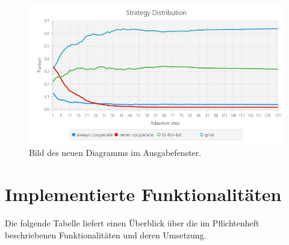 \documentclass[parskip=full,11pt]{scrartcl}
\begin{document}
\begin{figure}[h]
	\centering
	\includegraphics[width=\linewidth]{img/newoutput.png}
	\caption{Bild des neuen Diagramms im Ausgabefenster.}
	\label{fig:newoutput}
\end{figure}

\newpage
\section{Implementierte Funktionalitäten}
Die folgende Tabelle liefert einen Überblick über die im Pflichtenheft beschriebenen Funktionalitäten und deren Umsetzung.
\end{document}
